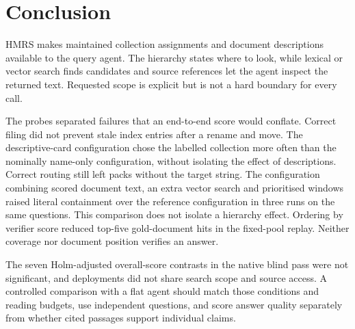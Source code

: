 \section{Conclusion}
\label{sec:conclusion}

HMRS makes maintained collection assignments and document descriptions
available to the query agent. The hierarchy states where to look, while
lexical or vector search finds candidates and source references let the
agent inspect the returned text. Requested scope is explicit but is not a
hard boundary for every call.

The probes separated failures that an end-to-end score would conflate.
Correct filing did not prevent stale index entries after a rename and move.
The descriptive-card configuration chose the labelled collection more
often than the nominally name-only configuration, without isolating the
effect of descriptions. Correct routing still left packs without the target
string. The configuration combining scored document text, an extra vector
search and prioritised windows raised literal containment over the reference
configuration in three runs on the same questions. This comparison does not
isolate a hierarchy effect.
Ordering by verifier score reduced top-five gold-document hits in the
fixed-pool replay. Neither coverage nor document position verifies an answer.

The seven Holm-adjusted overall-score contrasts in the native blind pass
were not significant, and deployments did not share search scope and source
access. A controlled comparison with a flat agent should match those
conditions and reading budgets, use independent questions, and score answer
quality separately from whether cited passages support individual claims.
